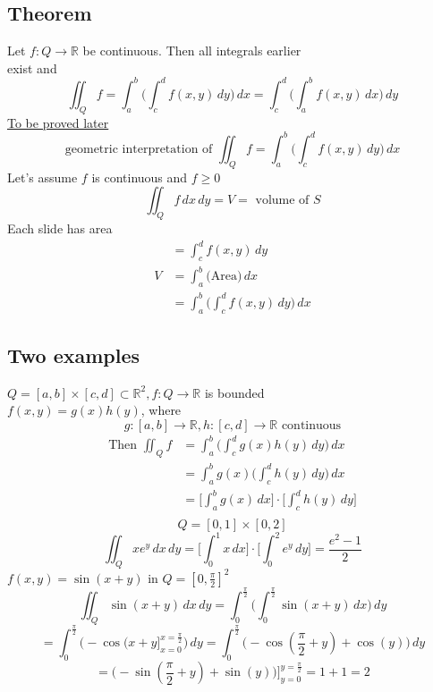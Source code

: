 \documentclass[12pt]{article}
\newcommand*\circled[1]{\tikz[baseline=(char.base)]{
    \node[shape=circle,draw,inner sep=2pt] (char) {#1};}}
\newcommand{\BR}{\mathbb R}
\begin{document}
\subsection*{Theorem}
  Let $f:Q\rightarrow\BR$ be continuous. Then all integrals earlier \\
  exist and \\
  \[ \iint_Qf=\int_a^b\bigg(\int_c^df(x,y)\,dy\bigg)\,dx=\int_c^d\bigg(\int_a^bf(x,y)\,dx\bigg)\,dy \]
  \underline{To be proved later} \\
  \[ \text{geometric interpretation of }\iint_Qf=\int_a^b\bigg(\int_c^df(x,y)\,dy\bigg)\,dx \]
  Let's assume $f$ is continuous and $f\geq 0$ \\
  \[ \iint_Qf\,dx\,dy=V=\text{ volume of }S \]
  Each slide has area \\
  \begin{align*}
    & = \int_c^df(x,y)\,dy \\
    V & = \int_a^b\bigg(\text{Area}\bigg)\,dx \\
    & = \int_a^b\bigg(\int_c^df(x,y)\,dy\bigg)\,dx
  \end{align*}
\subsection*{Two examples}
  $Q=[a,b]\times[c,d]\subset\BR^2,f:Q\rightarrow\BR$ is bounded \\
  \circled{1} $f(x,y)=g(x)h(y)$, where \\
  \[ g:[a,b]\rightarrow\BR,h:[c,d]\rightarrow\BR\text{ continuous} \]
  \begin{align*}
    \text{Then }\iint_Qf & = \int_a^b\bigg(\int_c^dg(x)h(y)\,dy\bigg)\,dx \\
    & = \int_a^bg(x)\bigg(\int_c^dh(y)\,dy\bigg)\,dx \\
    & = \bigg[\int_a^bg(x)\,dx\bigg]\cdot\bigg[\int_c^dh(y)\,dy\bigg] \\
  \end{align*}
  \[ Q=[0,1]\times[0,2] \]
  \[ \iint_Qxe^y\,dx\,dy=\bigg[\int_0^1x\,dx\bigg]\cdot\bigg[\int_0^2e^y\,dy\bigg]=\frac{e^2-1}{2} \]
  \circled{2} $f(x,y)=\sin(x+y)$ in $Q=[0,\frac{\pi}{2}]^2$ \\
  \[ \iint_Q\sin(x+y)\,dx\,dy=\int_0^{\frac{\pi}{2}}\bigg(\int_0^{\frac{\pi}{2}}\sin(x+y)\,dx\bigg)\,dy \]
  \[ =\int_0^{\frac{\pi}{2}}\bigg(-\cos(x+y\bigg]_{x=0}^{x=\frac{\pi}{2}}\bigg)\,dy=\int_0^{\frac{\pi}{2}}\bigg(-\cos(\frac{\pi}{2}+y)+\cos(y)\bigg)\,dy \]
  \[ =\bigg(-\sin(\frac{\pi}{2}+y)+\sin(y)\bigg)\bigg]_{y=0}^{y=\frac{\pi}{2}}=1+1=2 \]
\end{document}
